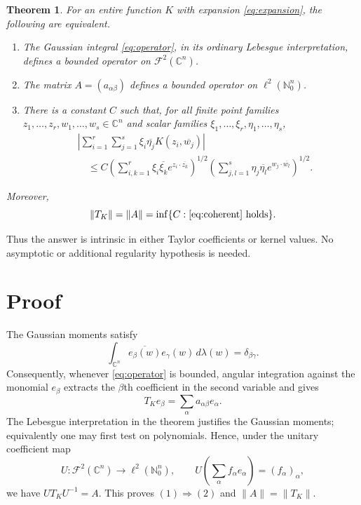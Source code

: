 \documentclass[11pt]{article}
\newtheorem{theorem}{Theorem}[section]
\theoremstyle{remark}
\newcommand{\C}{\mathbb{C}}
\newcommand{\F}{\mathcal{F}}
\newcommand{\ellTwo}{\ell^2(\mathbb{N}_0^n)}
\begin{document}
\begin{theorem}\label{thm:main}
For an entire function $K$ with expansion \eqref{eq:expansion}, the following
are equivalent.
\begin{enumerate}
\item The Gaussian integral \eqref{eq:operator}, in its ordinary Lebesgue
interpretation, defines a bounded operator on $\F^2(\C^n)$.
\item The matrix $A=(a_{\alpha\beta})$ defines a bounded operator on
$\ellTwo$.
\item There is a constant $C$ such that, for all finite point families
$z_1,\ldots,z_r,w_1,\ldots,w_s\in\C^n$ and scalar families
$\xi_1,\ldots,\xi_r,\eta_1,\ldots,\eta_s$,
\begin{align}\label{eq:coherent}
&\left|\sum_{i=1}^r\sum_{j=1}^s
 \xi_i\overline{\eta_j}K(z_i,\overline{w_j})\right|\\
&\quad\leq C
 \left(\sum_{i,k=1}^r\xi_i\overline{\xi_k}
 e^{z_i\cdot\overline{z_k}}\right)^{1/2}
 \left(\sum_{j,l=1}^s\eta_j\overline{\eta_l}
 e^{w_j\cdot\overline{w_l}}\right)^{1/2}.\nonumber
\end{align}
\end{enumerate}
Moreover,
\[
 \|T_K\|=\|A\|=\inf\{C:\eqref{eq:coherent}\text{ holds}\}.
\]
\end{theorem}

Thus the answer is intrinsic in either Taylor coefficients or kernel values.
No asymptotic or additional regularity hypothesis is needed.

\section{Proof}

The Gaussian moments satisfy
\begin{equation}\label{eq:moments}
 \int_{\C^n}\overline{e_\beta(w)}e_\gamma(w)\,d\lambda(w)
 =\delta_{\beta\gamma}.
\end{equation}
Consequently, whenever \eqref{eq:operator} is bounded, angular integration
against the monomial $e_\beta$ extracts the $\beta$th coefficient in the
second variable and gives
\begin{equation}\label{eq:matrix-action}
 T_Ke_\beta=\sum_\alpha a_{\alpha\beta}e_\alpha.
\end{equation}
The Lebesgue interpretation in the theorem justifies the Gaussian moments;
equivalently one may first test on polynomials.  Hence, under the unitary
coefficient map
\[
 U:\F^2(\C^n)\longrightarrow\ellTwo,
 \qquad U\!\left(\sum_\alpha f_\alpha e_\alpha\right)=(f_\alpha)_\alpha,
\]
we have $UT_KU^{-1}=A$.  This proves $(1)\Rightarrow(2)$ and
$\|A\|=\|T_K\|$.
\end{document}
